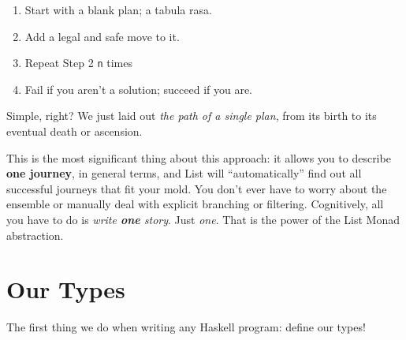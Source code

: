 \documentclass[]{article}
\begin{document}
\begin{enumerate}
\def\labelenumi{\arabic{enumi}.}
\tightlist
\item
  Start with a blank plan; a tabula rasa.
\item
  Add a legal and safe move to it.
\item
  Repeat Step 2 \texttt{n} times
\item
  Fail if you aren't a solution; succeed if you are.
\end{enumerate}

Simple, right? We just laid out \emph{the path of a single plan}, from its birth
to its eventual death or ascension.

This is the most significant thing about this approach: it allows you to
describe \textbf{one journey}, in general terms, and List will ``automatically''
find out all successful journeys that fit your mold. You don't ever have to
worry about the ensemble or manually deal with explicit branching or filtering.
Cognitively, all you have to do is \emph{write \textbf{one} story}. Just
\emph{one}. That is the power of the List Monad abstraction.

\hypertarget{our-types}{%
\section{Our Types}\label{our-types}}

The first thing we do when writing any Haskell program: define our types!
\end{document}

